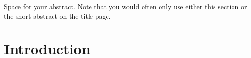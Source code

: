 \documentclass[a4paper,oneside,10pt,ngerman,english]{scrartcl}
\begin{document}


\maketitle


\cleardoubleoddpage
\tableofcontents




\cleardoubleoddpage


Space for your abstract.
Note that you would often only use either this section or the short abstract on the title page.




\cleardoubleoddpage

\section{Introduction}
\label{sec:introduction}
\end{document}
